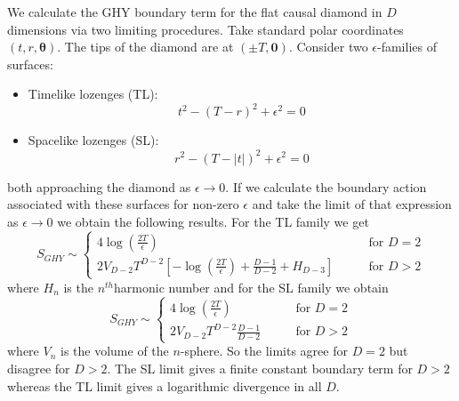 \documentclass{article}
\begin{document}
We calculate the GHY boundary term for the flat causal diamond in $D$ dimensions via two limiting procedures. Take standard polar coordinates $(t,r,\boldsymbol\theta)$. The tips of the diamond are at $(\pm T,\mathbf0)$. Consider two $\epsilon$-families of surfaces:
\begin{itemize}
\item Timelike lozenges (TL): 	$$t^2 - (T-r)^2 + \epsilon^2 = 0$$
\item Spacelike lozenges  (SL):	$$r^2 - (T-|t|)^2 + \epsilon^2  = 0$$
\end{itemize}
both approaching the diamond as $\epsilon\rightarrow0$. If we calculate the boundary action associated with these surfaces for non-zero $\epsilon$ and take the limit of that expression as $\epsilon\rightarrow0$ we obtain the following results. For the TL family we get
$$
S_{GHY} \sim
\begin{cases}
\displaystyle4\log\left(\frac{2T}{\epsilon}\right) \qquad&\text{for }D=2\\
\displaystyle2 V_{D-2}T^{D-2}\left[-\log\left(\frac{2T}{\epsilon}\right)+\frac{D-1}{D-2}+H_{D-3}\right]\qquad&\text{for }D>2
\end{cases}
$$
where $H_n$ is the $n^{th}$harmonic number
and for the SL family we obtain
$$
S_{GHY} \sim
\begin{cases}
\displaystyle4\log\left(\frac{2T}{\epsilon}\right) \qquad&\text{for }D=2\\
\displaystyle2 V_{D-2}T^{D-2}\frac{D-1}{D-2}\qquad&\text{for }D>2
\end{cases}
$$
where $V_n$ is the volume of the $n$-sphere. So the limits agree for $D=2$ but disagree for $D>2$.  The SL limit gives a finite constant boundary term for $D>2$ whereas the TL limit gives a logarithmic divergence in all $D$.
\end{document}
